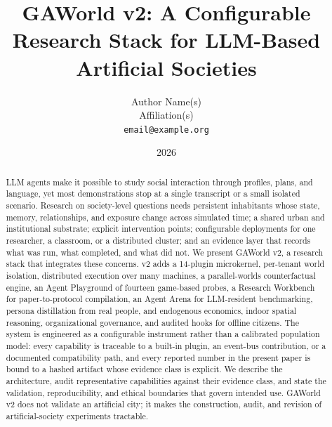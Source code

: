 \documentclass[10pt]{article}
\title{GAWorld v2: A Configurable Research Stack for LLM-Based Artificial Societies}
\author{Author Name(s)\\Affiliation(s)\\\texttt{email@example.org}}
\date{2026}
\begin{document}
\maketitle

\begin{abstract}
LLM agents make it possible to study social interaction through profiles, plans,
and language, yet most demonstrations stop at a single transcript or a small
isolated scenario.  Research on society-level questions needs persistent
inhabitants whose state, memory, relationships, and exposure change across
simulated time; a shared urban and institutional substrate; explicit
intervention points; configurable deployments for one researcher, a classroom,
or a distributed cluster; and an evidence layer that records what was run, what
completed, and what did not.  We present GAWorld v2, a research stack that
integrates these concerns.  v2 adds a 14-plugin microkernel, per-tenant world
isolation, distributed execution over many machines, a parallel-worlds
counterfactual engine, an Agent Playground of fourteen game-based probes, a
Research Workbench for paper-to-protocol compilation, an Agent Arena for
LLM-resident benchmarking, persona distillation from real people, and
endogenous economics, indoor spatial reasoning, organizational governance, and
audited hooks for offline citizens.  The system is engineered as a configurable
instrument rather than a calibrated population model: every capability is
traceable to a built-in plugin, an event-bus contribution, or a documented
compatibility path, and every reported number in the present paper is bound to
a hashed artifact whose evidence class is explicit.  We describe the
architecture, audit representative capabilities against their evidence class,
and state the validation, reproducibility, and ethical boundaries that govern
intended use.  GAWorld v2 does not validate an artificial city; it makes the
construction, audit, and revision of artificial-society experiments tractable.
\end{abstract}



















\end{document}
